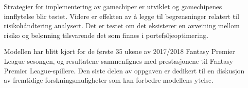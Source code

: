 \newpar

Strategier for implementering av gamechiper er utviklet og gamechipenes innflytelse blir testet. Videre er effekten av {\aa} legge til begrensninger relatert til risikoh\aa ndtering analysert. Det er testet om det eksisterer en avveining mellom risiko og bel\o nning tilsvarende det som finnes i portef\o ljeoptimering.

\newpar

Modellen har blitt kj\o rt for de f\o rste 35 ukene av 2017/2018 Fantasy Premier League sesongen, og resultatene sammenlignes med prestasjonene til Fantasy Premier League-spillere. Den siste delen av oppgaven er dedikert til en diskusjon av fremtidige forskningsmuligheter som kan forbedre modellens ytelse.

\clearpage